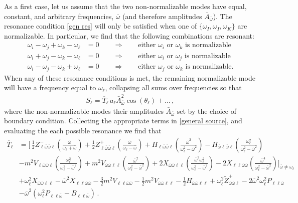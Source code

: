 \documentclass[letterpaper,11pt]{article}
\newcommand{\oi}{\omega_i}
\newcommand{\oj}{\omega_j}
\newcommand{\ok}{\omega_k}
\newcommand{\ol}{\omega_\ell}
\newcommand{\thl}{\theta_\ell}
\newcommand{\ob}{\overline{\omega}}
\begin{document}
As a first case, let us assume that the two non-normalizable modes have equal, constant, and arbitrary frequencies, $\ob$ (and therefore amplitudes $\bar A_{\ob}$). The resonance condition \eqref{gen res} will only be satisfied when one of $\{\omega_I, \omega_I, \omega_K \}$ are normalizable. In particular, we find that the following combinations are resonant:
\begin{align}
\label{gen nn res 1}
\oi - \oj + \ok - \ol &= 0 \qquad \Rightarrow \qquad \text{either $\oi$ or $\ok$ is normalizable} \\
\oi + \oj - \ok - \ol &= 0 \qquad \Rightarrow \qquad \text{either $\oi$ or $\oj$ is normalizable} \\
\oi - \oj - \ok + \ol &= 0 \qquad \Rightarrow \qquad \text{either $\oj$ or $\ok$ is normalizable.}
\label{gen nn res 2}
\end{align}
When any of these resonance conditions is met, the remaining normalizable mode will have a frequency equal to $\ol$, collapsing all sums over frequencies so that
\begin{align}
\label{2genNN}
S_\ell = \overline{T}_{\ell} \, a_\ell \bar A_{\ob}^2 \cos (\thl) + \ldots \, ,
\end{align}
where the non-normalizable modes their amplitudes $\bar A_{\ob}$ set by the choice of boundary condition. Collecting the appropriate terms in \eqref{general source}, and evaluating the each possible resonance we find that
\begin{align}
\label{S:2NN}
\overline{T}_{\ell} &=  \bigg[ \, \frac{1}{2} Z^-_{\ell\ob\ob\ell} \left( \frac{\ob}{\ol + \ob} \right) + \frac{1}{2} Z^+_{\ell\ob\ob\ell} \left( \frac{\ob}{\ol - \ob} \right)  + H_{\ell \ob \ob \ell} \left( \frac{\ob^2}{\ol^2 - \ob^2} \right)  - H_{\ob\ell\ob\ell} \left(\frac{\ol^2}{\ol^2 - \ob^2} \right) \nonumber \\
%
& - m^2 V_{\ell \ob\ob\ell}  \left(\frac{\ol^2}{\ol^2 - \ob^2} \right) + m^2 V_{\ob\ob\ell\ell} \left( \frac{\ob^2}{\ol^2 - \ob^2} \right) + 2 X_{\ob\ob\ell\ell} \left( \frac{\ob^2 \ol^2}{\ol^2 - \ob^2} \right) - 2 X_{\ell\ell\ob\ob} \left( \frac{\ob^4}{\ol^2 - \ob^2} \right) \bigg]_{\ob \neq \ol} \nonumber \\
%
&  + \ol^2 X_{\ob\ob\ell\ell}  - \ob^2 X_{\ell\ell\ob\ob} - \frac{3}{2} m^2 V_{\ell\ell\ob\ob} - \frac{1}{2} m^2 V_{\ob\ob\ell\ell}  - \frac{1}{2} H_{\ob\ob\ell\ell} + \ol^2 \tilde{Z}^+_{\ob\ob\ell} - 2 \ob^2 \ol^2 P_{\ell\ell\ob} \nonumber \\
%
& - \ob^2 \left( \ol^2 P_{\ell\ell \ob} - B_{\ell\ell\ob} \right) \, .
\end{align}
\end{document}
